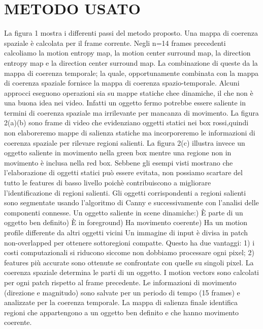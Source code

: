 \documentclass[12pt,oneside]{IEEEtran}
\begin{document}
	\section{METODO USATO}
		La figura 1 mostra i differenti passi del metodo proposto. Una mappa di coerenza spaziale è calcolata per il frame corrente. Negli n=14 frames precedenti calcoliamo la motion entropy map, la motion center surround map, la direction entropy map e la direction center surround map. La combinazione di queste da la mappa di coerenza temporale; la quale, opportunamente combinata con la mappa di coerenza spaziale fornisce la mappa di coerenza spazio-temporale.\newline
		Alcuni approcci eseguono operazioni sia su mappe statiche chee dinamiche, il che non è una buona idea nei video. Infatti un oggetto fermo potrebbe essere saliente in termini di coerenza spaziale ma irrilevante per mancanza di movimento. La figura 2(a)(b) sono frame di video che evidenziano oggetti statici nei box rossi,quindi non elaboreremo mappe di salienza statiche ma incorporeremo le informazioni di coerenza spaziale per rilevare regioni salienti. La figura 2(c) illustra invece un oggetto saliente in movimento nella green box mentre una regione non in movimento è inclusa nella red box. Sebbene gli esempi visti mostrano che l'elaborazione di oggetti statici può essere evitata, non possiamo scartare del tutto le features di basso livello poichè contribuiscono a migliorare l'identificazione di regioni salienti.\newline
		Gli oggetti corrispondenti a regioni salienti sono segmentate usando l'algoritmo di Canny e successivamente con l'analisi delle componenti connesse. Un oggetto saliente in scene dinamiche:) È parte di un oggetto ben definito) È in foreground) Ha movimento coerente) Ha un motion profile differente da altri oggetti vicini\newline
		Un immagine di input è divisa in patch non-overlapped per ottenere sottoregioni compatte. Questo ha due vantaggi: 1) i costi computazionali si riducono siccome non dobbiamo processare ogni pixel; 2) features più accurate sono ottenute se confrontate con quelle su singoli pixel.
		La coerenza spaziale determina le parti di un oggetto. I motion vectors sono calcolati per ogni patch rispetto al frame precedente. Le informazioni di movimento (direzione e magnitudo) sono salvate per un periodo di tempo (15 frames) e analizzate per la coerenza temporale. La mappa di salienza finale identifica regioni che appartengono a un oggetto ben definito e che hanno movimento coerente.
\end{document}

